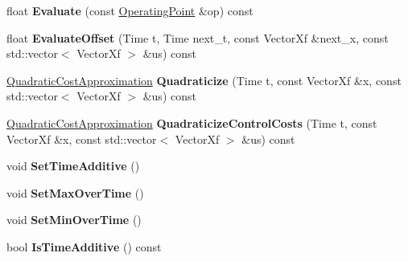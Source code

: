 \begin{DoxyCompactItemize}
\item 
float {\bfseries Evaluate} (const \hyperlink{structilqgames_1_1_operating_point}{Operating\+Point} \&op) const \hypertarget{classilqgames_1_1_player_cost_aca633f98a31ed099a814b982d0efb584}{}\label{classilqgames_1_1_player_cost_aca633f98a31ed099a814b982d0efb584}

\item 
float {\bfseries Evaluate\+Offset} (Time t, Time next\+\_\+t, const Vector\+Xf \&next\+\_\+x, const std\+::vector$<$ Vector\+Xf $>$ \&us) const \hypertarget{classilqgames_1_1_player_cost_a56bf9c10b7ffa6fbdfb1a9bff1ce65c3}{}\label{classilqgames_1_1_player_cost_a56bf9c10b7ffa6fbdfb1a9bff1ce65c3}

\item 
\hyperlink{structilqgames_1_1_quadratic_cost_approximation}{Quadratic\+Cost\+Approximation} {\bfseries Quadraticize} (Time t, const Vector\+Xf \&x, const std\+::vector$<$ Vector\+Xf $>$ \&us) const \hypertarget{classilqgames_1_1_player_cost_ad3962847f8eda8bcfecf2096e6abccb6}{}\label{classilqgames_1_1_player_cost_ad3962847f8eda8bcfecf2096e6abccb6}

\item 
\hyperlink{structilqgames_1_1_quadratic_cost_approximation}{Quadratic\+Cost\+Approximation} {\bfseries Quadraticize\+Control\+Costs} (Time t, const Vector\+Xf \&x, const std\+::vector$<$ Vector\+Xf $>$ \&us) const \hypertarget{classilqgames_1_1_player_cost_a1273b7fbbfc4cca818ebdcf6942662ba}{}\label{classilqgames_1_1_player_cost_a1273b7fbbfc4cca818ebdcf6942662ba}

\item 
void {\bfseries Set\+Time\+Additive} ()\hypertarget{classilqgames_1_1_player_cost_aabdacf36b0f3bc01b96ea1b62da9737a}{}\label{classilqgames_1_1_player_cost_aabdacf36b0f3bc01b96ea1b62da9737a}

\item 
void {\bfseries Set\+Max\+Over\+Time} ()\hypertarget{classilqgames_1_1_player_cost_ab348e49baf8f7e580914a17ce79f175e}{}\label{classilqgames_1_1_player_cost_ab348e49baf8f7e580914a17ce79f175e}

\item 
void {\bfseries Set\+Min\+Over\+Time} ()\hypertarget{classilqgames_1_1_player_cost_a00b0e84c89dfef9375d3ee17c9b8e4ef}{}\label{classilqgames_1_1_player_cost_a00b0e84c89dfef9375d3ee17c9b8e4ef}

\item 
bool {\bfseries Is\+Time\+Additive} () const \hypertarget{classilqgames_1_1_player_cost_a0a7a783fc2d25d16b20d8ecb232de147}{}\label{classilqgames_1_1_player_cost_a0a7a783fc2d25d16b20d8ecb232de147}


\end{DoxyCompactItemize}
